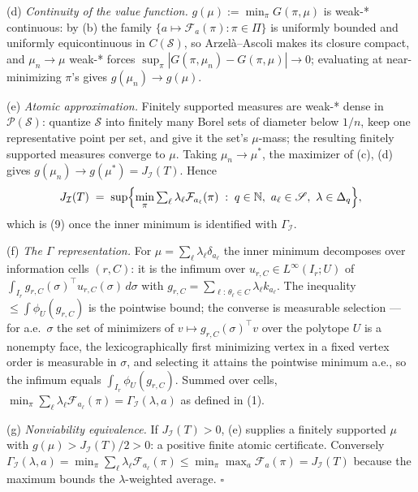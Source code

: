 \documentclass[10pt,article]{article}
\begin{document}
(d) \emph{Continuity of the value function.} \(g(\mu) := \min_\pi
G(\pi, \mu)\) is weak-* continuous: by (b) the family
\(\{a \mapsto \mathcal F_a(\pi) : \pi \in \Pi\}\) is uniformly
bounded and uniformly equicontinuous in \(C(\mathscr S)\), so
Arzel\`a--Ascoli makes its closure compact, and \(\mu_n \to \mu\)
weak-* forces \(\sup_\pi |G(\pi, \mu_n) - G(\pi, \mu)| \to 0\);
evaluating at near-minimizing \(\pi\)'s gives \(g(\mu_n) \to
g(\mu)\).

(e) \emph{Atomic approximation.} Finitely supported measures are weak-*
dense in \(\mathcal P(\mathscr S)\): quantize \(\mathscr S\) into
finitely many Borel sets of diameter below \(1/n\), keep one
representative point per set, and give it the set's \(\mu\)-mass; the
resulting finitely supported measures converge to \(\mu\). Taking
\(\mu_n \to \mu^{*}\), the maximizer of (c), (d) gives
\(g(\mu_n) \to g(\mu^{*}) = J_{\mathcal I}(T)\). Hence
\[
J_{\mathcal I}(T) \;=\; \sup\Bigl\{ \min_\pi
\textstyle\sum_\ell \lambda_\ell \mathcal F_{a_\ell}(\pi)
\;:\; q \in \mathbb N,\ a_\ell \in \mathscr S,\
\lambda \in \Delta_q \Bigr\},
\]
which is (9) once the inner minimum is identified with
\(\Gamma_{\mathcal I}\).

(f) \emph{The \(\Gamma\) representation.} For
\(\mu = \sum_\ell \lambda_\ell \delta_{a_\ell}\) the inner minimum
decomposes over information cells \((r, C)\): it is the infimum over
\(u_{r,C} \in L^\infty(I_r; U)\) of
\(\int_{I_r} g_{r,C}(\sigma)^\top u_{r,C}(\sigma)\,d\sigma\) with
\(g_{r,C} = \sum_{\ell:\,\theta_\ell \in C} \lambda_\ell
k_{a_\ell}\). The inequality \(\le \int \phi_U(g_{r,C})\) is the
pointwise bound; the converse is measurable selection --- for a.e.\
\(\sigma\) the set of minimizers of \(v \mapsto g_{r,C}(\sigma)^\top
v\) over the polytope \(U\) is a nonempty face, the lexicographically
first minimizing vertex in a fixed vertex order is measurable in
\(\sigma\), and selecting it attains the pointwise minimum a.e.,
so the infimum equals \(\int_{I_r} \phi_U(g_{r,C})\). Summed over
cells, \(\min_\pi \sum_\ell \lambda_\ell
\mathcal F_{a_\ell}(\pi) = \Gamma_{\mathcal I}(\lambda, a)\) as
defined in (1).

(g) \emph{Nonviability equivalence.} If \(J_{\mathcal I}(T) > 0\), (e)
supplies a finitely supported \(\mu\) with
\(g(\mu) > J_{\mathcal I}(T)/2 > 0\): a positive finite atomic
certificate. Conversely
\(\Gamma_{\mathcal I}(\lambda, a) = \min_\pi \sum_\ell
\lambda_\ell \mathcal F_{a_\ell}(\pi) \le \min_\pi \max_a
\mathcal F_a(\pi) = J_{\mathcal I}(T)\) because the maximum bounds the
\(\lambda\)-weighted average. \(\square\)
\end{document}
